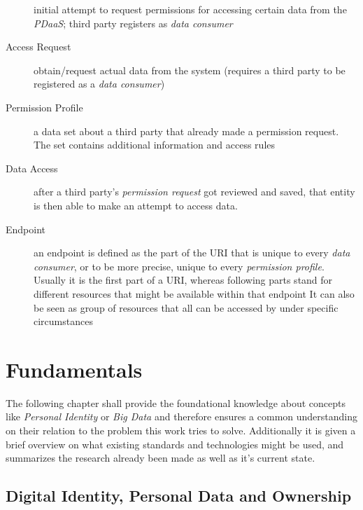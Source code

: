 \documentclass[12pt,english,a4paper,titlepage,cleardoublepage=empty,dottedtoc]{report}
\begin{document}
\begin{description}
initial attempt to request permissions for accessing certain data from
the \emph{PDaaS}; third party registers as \emph{data consumer}
\item[Access Request]
obtain/request actual data from the system (requires a third party to be
registered as a \emph{data consumer})
\item[Permission Profile]
a data set about a third party that already made a permission request.
The set contains additional information and access rules
\item[Data Access]
after a third party's \emph{permission request} got reviewed and saved,
that entity is then able to make an attempt to access data.
\item[Endpoint]
an endpoint is defined as the part of the URI that is unique to every
\emph{data consumer}, or to be more precise, unique to every
\emph{permission profile}. Usually it is the first part of a URI,
whereas following parts stand for different resources that might be
available within that endpoint It can also be seen as group of resources
that all can be accessed by under specific circumstances
\end{description}

\chapter{Fundamentals}\label{fundamentals}

The following chapter shall provide the foundational knowledge about
concepts like \emph{Personal Identity} or \emph{Big Data} and therefore
ensures a common understanding on their relation to the problem this
work tries to solve. Additionally it is given a brief overview on what
existing standards and technologies might be used, and summarizes the
research already been made as well as it's current state.

\hypertarget{digital-identity-personal-data-and-ownership}{\section{Digital
Identity, Personal Data and
Ownership}\label{digital-identity-personal-data-and-ownership}}
\end{document}
